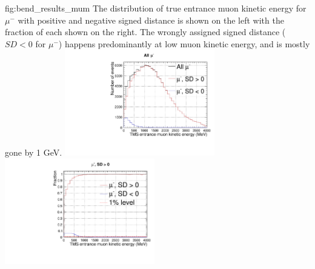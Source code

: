 \begin{dunefigure}{fig:bend_results_mum}
{The distribution of true  entrance muon kinetic energy for $\mu^-$ with positive and negative signed distance is shown on the left with the fraction of each shown on the right. The wrongly assigned signed distance ($SD<0$ for $\mu^-$) happens predominantly at low muon kinetic energy, and is mostly gone by 1 GeV.}
\includegraphics[width=0.49\textwidth, clip, trim={0mm 0mm 0mm 10mm}]{graphics/tms/Simulation/Bend/cmetric_signed_distance_KE.pdf} \includegraphics[width=0.49\textwidth, clip, trim={0mm 0mm 0mm 10mm}]{graphics/tms/Simulation/Bend/cmetric_signed_distance_KE_ratio.pdf}
\end{dunefigure}

